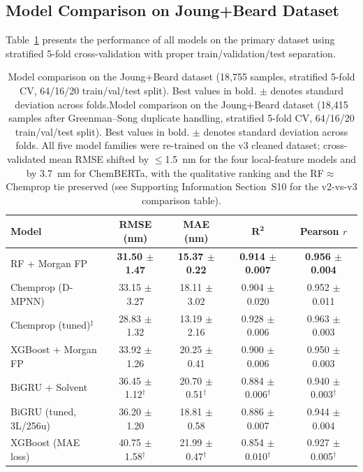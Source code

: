 \documentclass[journal=jcisd8,manuscript=article]{achemso}
\newcommand{\added}[1]{{\color{addedblue}#1}}
\newcommand{\removed}[1]{{\color{removedred}#1}}
\begin{document}
\subsection{Model Comparison on Joung+Beard Dataset}
\label{sec:model_comparison}

Table~\ref{tab:model_comparison} presents the performance of all models on the primary dataset using stratified 5-fold cross-validation with proper train/validation/test separation.

\begin{table}[htbp]
\centering
\caption{\removed{Model comparison on the Joung+Beard dataset (18,755 samples, stratified 5-fold CV, 64/16/20 train/val/test split). Best values in bold. $\pm$ denotes standard deviation across folds.}\added{Model comparison on the Joung+Beard dataset (18,415 samples after Greenman--Song duplicate handling, stratified 5-fold CV, 64/16/20 train/val/test split). Best values in bold. $\pm$ denotes standard deviation across folds. All five model families were re-trained on the v3 cleaned dataset; cross-validated mean RMSE shifted by $\leq$1.5~nm for the four local-feature models and by 3.7~nm for ChemBERTa, with the qualitative ranking and the RF$\approx$Chemprop tie preserved (see Supporting Information Section~S10 for the v2-vs-v3 comparison table).}}
\label{tab:model_comparison}
\small
\setlength{\tabcolsep}{4pt}
\added{%
\begin{tabular}{lcccc}
\toprule
\textbf{Model} & \textbf{RMSE (nm)} & \textbf{MAE (nm)} & $\boldsymbol{R^2}$ & \textbf{Pearson $r$} \\
\midrule
RF + Morgan FP & \textbf{31.50 $\pm$ 1.47} & \textbf{15.37 $\pm$ 0.22} & \textbf{0.914 $\pm$ 0.007} & \textbf{0.956 $\pm$ 0.004} \\
Chemprop (D-MPNN) & 33.15 $\pm$ 3.27 & 18.11 $\pm$ 3.02 & 0.904 $\pm$ 0.020 & 0.952 $\pm$ 0.011 \\
Chemprop (tuned)$^{\ddagger}$ & 28.83 $\pm$ 1.32 & 13.19 $\pm$ 2.16 & 0.928 $\pm$ 0.006 & 0.963 $\pm$ 0.003 \\
XGBoost + Morgan FP & 33.92 $\pm$ 1.26 & 20.25 $\pm$ 0.41 & 0.900 $\pm$ 0.006 & 0.950 $\pm$ 0.003 \\
BiGRU + Solvent & 36.45 $\pm$ 1.12$^{\dagger}$ & 20.70 $\pm$ 0.51$^{\dagger}$ & 0.884 $\pm$ 0.006$^{\dagger}$ & 0.940 $\pm$ 0.003$^{\dagger}$ \\
BiGRU (tuned, 3L/256u)& 36.20 $\pm$ 1.20 & 18.81 $\pm$ 0.58 & 0.886 $\pm$ 0.007 & 0.944 $\pm$ 0.004 \\
XGBoost (MAE loss) & 40.75 $\pm$ 1.58$^{\dagger}$ & 21.99 $\pm$ 0.47$^{\dagger}$ & 0.854 $\pm$ 0.010$^{\dagger}$ & 0.927 $\pm$ 0.005$^{\dagger}$ \\

\end{tabular}}
\end{table}
\end{document}
